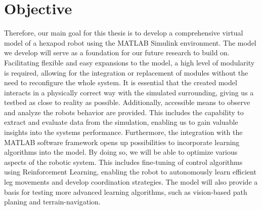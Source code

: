 


\section{Objective}
Therefore, our main goal for this thesis is to develop a comprehensive virtual model of a hexapod robot using the MATLAB Simulink\textsuperscript{\textregistered} environment.
The model we develop will serve as a foundation for our future research to build on.
Facilitating flexible and easy expansions to the model, a high level of modularity is required, allowing for the integration or replacement of modules without the need to reconfigure the whole system.
It is essential that the created model interacts in a physically correct way with the simulated surrounding, giving us a testbed as close to reality as possible.
Additionally, accessible means to observe and analyze the robots behavior are provided.
This includes the capability to extract and evaluate data from the simulation, enabling us to gain valuable insights into the systems performance.
Furthermore, the integration with the MATLAB software framework opens up possibilities to incorporate learning algorithms into the model.
By doing so, we will be able to optimize various aspects of the robotic system. 
This includes fine-tuning of control algorithms using Reinforcement Learning, enabling the robot to autonomously learn efficient leg movements and develop coordination strategies.
The model will also provide a basis for testing more advanced learning algorithms, such as vision-based path planing and terrain-navigation.

